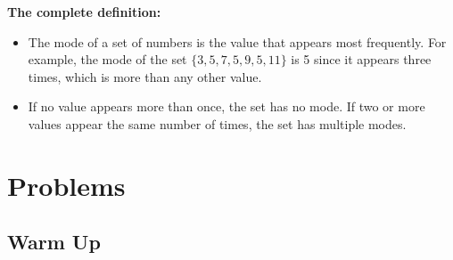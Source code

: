 \documentclass[11pt]{scrartcl}
\begin{document}
    \textbf{The complete definition:}
\begin{itemize}
    \item The mode of a set of numbers is the value that appears most frequently. For example, the mode of the set $\{3, 5, 7, 5, 9, 5, 11\}$ is 5 since it appears three times, which is more than any other value.

    \item If no value appears more than once, the set has no mode. If two or more values appear the same number of times, the set has multiple modes.
\end{itemize}
    
\section{Problems}
\subsection{Warm Up}
\end{document}
